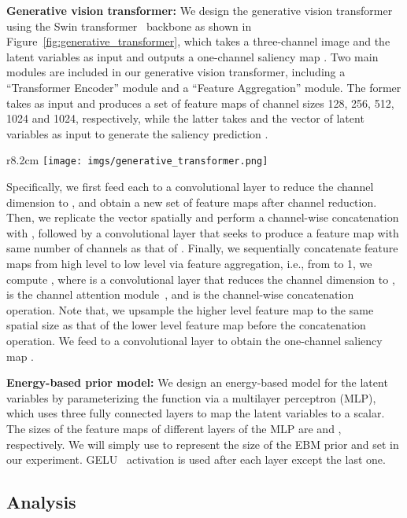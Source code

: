 \documentclass{article}
\begin{document}
\noindent\textbf{Generative vision transformer:}
We design the generative vision transformer using the Swin transformer~\cite{liu2021swin} backbone as shown in Figure~\ref{fig:generative_transformer}, which takes a three-channel image  and the latent variables  as input and outputs a one-channel saliency map . Two main modules are included in our generative vision transformer, including a \enquote{Transformer Encoder} module and a \enquote{Feature Aggregation} module. The former takes  as input and produces a set of feature maps  of channel sizes 128, 256, 512, 1024 and 1024, respectively, while the latter takes  and the vector of latent variables  as input to generate the saliency prediction .
\begin{wrapfigure}{r}{8.2cm}
\centering
\texttt{[image: imgs/generative\_transformer.png]}
\caption{Generative latent variable vision transformer}
\label{fig:generative_transformer}
\end{wrapfigure}
Specifically, we first feed each  to a  convolutional layer to reduce the channel dimension to , and obtain a new set of feature maps  after channel reduction. Then, we replicate the vector  spatially and perform a channel-wise concatenation with
, followed by a  convolutional layer that seeks to produce a feature map  with same number of channels as that of .
Finally, we sequentially concatenate feature maps from  high level to low level via feature aggregation, i.e., from  to 1, we compute ,  where  is a  convolutional layer that reduces the channel dimension to ,  is the channel attention module~\cite{rca_eccv}, and  is the channel-wise concatenation operation. Note that, we upsample the higher level feature map to the same spatial size as that of the lower level feature map before the concatenation operation. We feed  to a  convolutional layer to obtain
the one-channel saliency map .




\noindent\textbf{Energy-based prior model:}
We design an energy-based model for the latent variables  by parameterizing the function  via a multilayer perceptron (MLP), which uses three fully connected layers to map the latent variables  to a scalar. The sizes of the feature maps of different layers of the MLP are  and , respectively. We will simply use  to represent the size of the EBM prior and set  in our experiment. GELU~\cite{hendrycks2016gaussian} activation is used after each layer except the last one. 

\subsection{Analysis}
\end{document}
